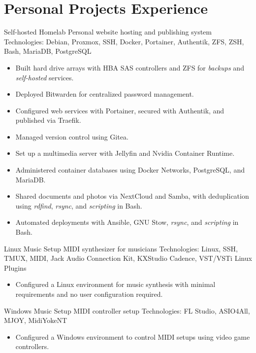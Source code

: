 \documentclass[12pt,letterpaper,sans]{moderncv}
\begin{document}
\section{Personal Projects Experience}

\cventry{}
{Self-hosted Homelab}
{Personal website hosting and publishing system}
{\newline Technologies: Debian, Proxmox, SSH, Docker, Portainer, Authentik, ZFS, ZSH, Bash, MariaDB, PostgreSQL}
{\newline}
{
  \begin{itemize}
    \item Built hard drive arrays with HBA SAS controllers and ZFS for \textit{backups} and \textit{self-hosted} services.
    \item Deployed Bitwarden for centralized password management.
    \item Configured web services with Portainer, secured with Authentik, and published via Traefik.
    \item Managed version control using Gitea.
    \item Set up a multimedia server with Jellyfin and Nvidia Container Runtime.
    \item Administered container databases using Docker Networks, PostgreSQL, and MariaDB.
    \item Shared documents and photos via NextCloud and Samba, with deduplication using \textit{rdfind}, \textit{rsync}, and \textit{scripting} in Bash.
    \item Automated deployments with Ansible, GNU Stow, \textit{rsync}, and \textit{scripting} in Bash.
  \end{itemize}
}
\vspace{0.5em}

\cventry{}
{Linux Music Setup}
{MIDI synthesizer for musicians}
{\newline Technologies: Linux, SSH, TMUX, MIDI, Jack Audio Connection Kit, KXStudio Cadence, VST/VSTi Linux Plugins}
{\newline}
{
  \begin{itemize}
    \item Configured a Linux environment for music synthesis with minimal requirements and no user configuration required.
  \end{itemize}
}
\vspace{0.5em}

\cventry{}
{Windows Music Setup}
{MIDI controller setup}
{\newline Technologies: FL Studio, ASIO4All, MJOY, MidiYokeNT}
{\newline}
{
  \begin{itemize}
    \item Configured a Windows environment to control MIDI setups using video game controllers.
  \end{itemize}
}
\vspace{0.5em}
\end{document}
